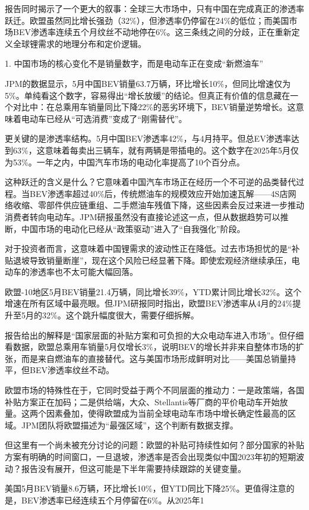 \documentclass[11pt]{ctexart}
\begin{document}
报告同时揭示了一个更大的叙事：全球三大市场中，只有中国在完成真正的渗透率跃迁。欧盟虽然同比增长强劲（32\%），但渗透率仍停留在24\%的低位；而美国市场BEV渗透率连续五个月纹丝不动地停在6\%。这三条线之间的分歧，正在重新定义全球锂需求的地理分布和定价逻辑。

1. 中国市场的核心变化不是销量数字，而是电动车正在变成“新燃油车”

JPM的数据显示，5月中国BEV销量63.7万辆，环比增长10\%，但同比增速仅为5\%。单纯看这个数字，容易得出“增长放缓”的结论。但真正有价值的信息藏在一个对比中：在总乘用车销量同比下降22\%的恶劣环境下，BEV销量逆势增长。这意味着电动车已经从“可选消费”变成了“刚需替代”。

更关键的是渗透率结构。5月中国BEV渗透率42\%，与4月持平。但总EV渗透率达到63\%，这意味着每卖出三辆车，就有两辆是带插电的。这个数字在2025年5月仅为53\%。一年之内，中国汽车市场的电动化率提高了10个百分点。

这种跃迁的含义是什么？它意味着中国汽车市场正在经历一个不可逆的品类替代过程。当BEV渗透率超过40\%后，传统燃油车的规模效应开始加速瓦解——4S店网络收缩、零部件供应链重组、二手燃油车残值下降，这些因素会反过来进一步推动消费者转向电动车。JPM研报虽然没有直接论述这一点，但从数据趋势可以推断，中国市场的电动化已经从“政策驱动”进入了“自我强化”阶段。

对于投资者而言，这意味着中国锂需求的波动性正在降低。过去市场担忧的是“补贴退坡导致销量断崖”，现在这个风险已经显著下降。即使宏观经济继续承压，电动车的渗透率也不太可能大幅回落。

欧盟-10地区5月BEV销量21.4万辆，同比增长39\%，YTD累计同比增长32\%。这个增速在所有区域中最亮眼。但JPM研报同时指出，欧盟BEV渗透率从4月的24\%提升至5月的32\%。这个跳升幅度很大，需要仔细拆解。

报告给出的解释是“国家层面的补贴方案和可负担的大众电动车进入市场”。但仔细看数据，欧盟总乘用车销量5月仅增长3\%，说明BEV的增长并非来自整体市场的扩张，而是来自燃油车的直接替代。这与美国市场形成鲜明对比——美国总销量持平，但BEV渗透率纹丝不动。

欧盟市场的特殊性在于，它同时受益于两个不同层面的推动力：一是政策端，各国补贴方案正在加码；二是供给端，大众、Stellantis等厂商的平价电动车开始放量。这两个因素叠加，使得欧盟成为当前全球电动车市场中增长确定性最高的区域。JPM团队将欧盟描述为“最强区域”，这个判断有数据支撑。

但这里有一个尚未被充分讨论的问题：欧盟的补贴可持续性如何？部分国家的补贴方案有明确的时间窗口，一旦退坡，渗透率是否会出现类似中国2023年初的短期波动？报告没有展开，但这可能是下半年需要持续跟踪的关键变量。

美国5月BEV销量8.6万辆，环比增长10\%，但YTD同比下降25\%。更值得注意的是，BEV渗透率已经连续五个月停留在6\%。从2025年1
\end{document}
